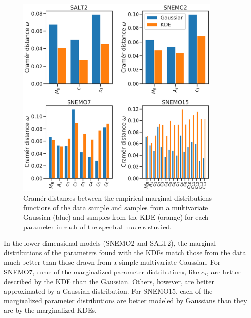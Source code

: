 \begin{figure}
    \centering
    \includegraphics[width=0.9\textwidth]{figures/snemo_kde/cramer_distances_param_space.pdf}
    \caption{Cram\'{e}r distances between the empirical marginal distributions functions of the data sample and samples from a multivariate Gaussian (blue) and samples from the KDE (orange) for each parameter in each of the spectral models studied.}
    \label{fig:distances}
\end{figure}

In the lower-dimensional models (SNEMO2 and SALT2), the marginal distributions of the parameters found with the KDEs match those from the data much better than those drawn from a simple multivariate Gaussian. For SNEMO7, some of the marginalized parameter distributions, like $c_2$, are better described by the KDE than the Gaussian. Others, however, are better approximated by a Gaussian distribution. For SNEMO15, each of the marginalized parameter distributions are better modeled by Gaussians than they are by the marginalized KDEs. 

